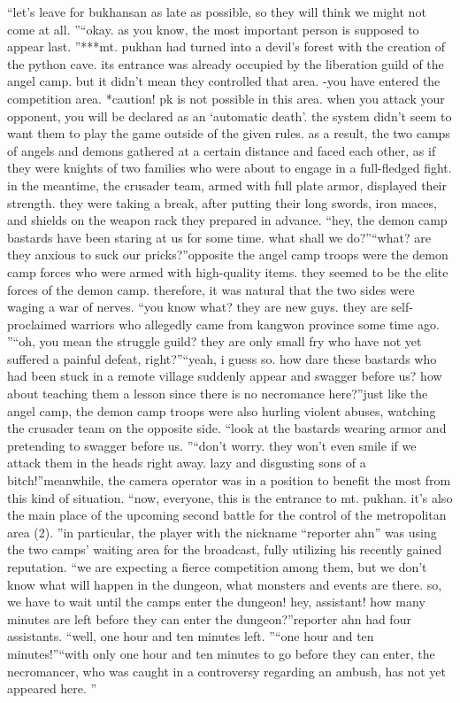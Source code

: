 “let’s leave for bukhansan as late as possible, so they will think we might not come at all.
”“okay.
 as you know, the most important person is supposed to appear last.
”***mt.
 pukhan had turned into a devil’s forest with the creation of the python cave.
its entrance was already occupied by the liberation guild of the angel camp.
 but it didn’t mean they controlled that area.
-you have entered the competition area.
*caution! pk is not possible in this area.
 when you attack your opponent, you will be declared as an ‘automatic death’.
the system didn’t seem to want them to play the game outside of the given rules.
as a result, the two camps of angels and demons gathered at a certain distance and faced each other, as if they were knights of two families who were about to engage in a full-fledged fight.
in the meantime, the crusader team, armed with full plate armor, displayed their strength.
 they were taking a break, after putting their long swords, iron maces, and shields on the weapon rack they prepared in advance.
“hey, the demon camp bastards have been staring at us for some time.
 what shall we do?”“what? are they anxious to suck our pricks?”opposite the angel camp troops were the demon camp forces who were armed with high-quality items.
 they seemed to be the elite forces of the demon camp.
therefore, it was natural that the two sides were waging a war of nerves.
“you know what? they are new guys.
 they are self-proclaimed warriors who allegedly came from kangwon province some time ago.
”“oh, you mean the struggle guild? they are only small fry who have not yet suffered a painful defeat, right?”“yeah, i guess so.
 how dare these bastards who had been stuck in a remote village suddenly appear and swagger before us? how about teaching them a lesson since there is no necromance here?”just like the angel camp, the demon camp troops were also hurling violent abuses, watching the crusader team on the opposite side.
“look at the bastards wearing armor and pretending to swagger before us.
”“don’t worry.
 they won’t even smile if we attack them in the heads right away.
 lazy and disgusting sons of a bitch!”meanwhile, the camera operator was in a position to benefit the most from this kind of situation.
“now, everyone, this is the entrance to mt.
 pukhan.
 it’s also the main place of the upcoming second battle for the control of the metropolitan area (2).
”in particular, the player with the nickname “reporter ahn” was using the two camps’ waiting area for the broadcast, fully utilizing his recently gained reputation.
“we are expecting a fierce competition among them, but we don’t know what will happen in the dungeon, what monsters and events are there.
 so, we have to wait until the camps enter the dungeon! hey, assistant! how many minutes are left before they can enter the dungeon?”reporter ahn had four assistants.
“well, one hour and ten minutes left.
”“one hour and ten minutes!”“with only one hour and ten minutes to go before they can enter, the necromancer, who was caught in a controversy regarding an ambush, has not yet appeared here.
”

